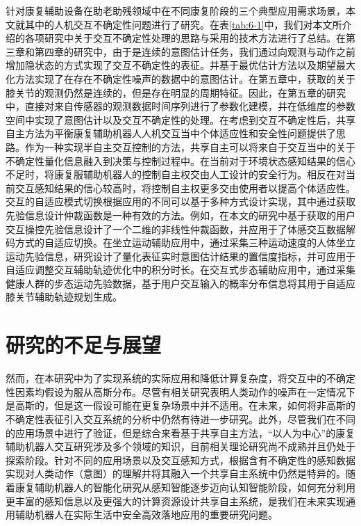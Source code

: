 针对康复辅助设备在助老助残领域中在不同康复阶段的三个典型应用需求场景，本文就其中的人机交互不确定性问题进行了研究。在表\ref{tab:6-1}中，我们对本文所介绍的各项研究中关于交互不确定性处理的思路与采用的技术方法进行了总结。在第三章和第四章的研究中，由于是连续的意图估计任务，我们通过向观测与动作之前增加隐状态的方式实现了交互不确定性的表征。并基于最优估计方法以及期望最大化方法实现了在存在不确定性噪声的数据中的意图估计。在第五章中，获取的关于膝关节的观测仍然是连续的，但是存在明显的周期特征。因此，在第五章的研究中，直接对来自传感器的观测数据时间序列进行了参数化建模，并在低维度的参数空间中实现了意图估计以及交互不确定性的处理。在考虑到交互不确定性后，共享自主方法为平衡康复辅助机器人人机交互当中个体适应性和安全性问题提供了思路。作为一种实现半自主交互控制的方法，共享自主可以将来自于交互当中的关于不确定性量化信息融入到决策与控制过程中。在当前对于环境状态感知结果的信心不足时，将康复服辅助机器人的控制自主权交由人工设计的安全行为。相反在对当前交互感知结果的信心较高时，将控制自主权更多交由使用者以提高个体适应性。交互的自适应模式切换根据应用的不同可以基于多种方式设计实现，其中通过获取先验信息设计仲裁函数是一种有效的方法。例如，在本文的研究中基于获取的用户交互操控先验信息设计了一个二维的非线性仲裁函数，并应用于了体感交互数据解码方式的自适应切换。在坐立运动辅助应用中，通过采集三种运动速度的人体坐立运动先验信息，研究设计了量化表征实时意图估计结果的置信度指标，并可应用于自适应调整交互辅助轨迹优化中的积分时长。在交互式步态辅助应用中，通过采集健康人群的步态运动先验数据，基于用户交互输入的概率分布信息将其用于自适应膝关节辅助轨迹规划生成。

\section{研究的不足与展望}
然而，在本研究中为了实现系统的实际应用和降低计算复杂度，将交互中的不确定性因素均假设为服从高斯分布。尽管有相关研究表明人类动作的噪声在一定情况下是高斯的，但是这一假设可能在更复杂场景中并不适用。在未来，如何将非高斯的不确定性表征引入交互系统的分析中仍然有待进一步研究。此外，尽管我们在不同的应用场景中进行了验证，但是综合来看基于共享自主方法，``以人为中心''的康复辅助机器人交互研究涉及多个领域的知识，目前相关理论研究尚不成熟并且仍处于探索阶段。针对不同的应用场景以及交互感知方式，根据含有不确定性的感知数据实现对人类动作（意图）的理解并将其融入一个共享自主系统中仍然是特异的。随着康复辅助机器人的智能化研究从感知智能逐步迈向认知智能阶段，如何充分利用更丰富的感知信息以及更强大的计算资源设计共享自主系统，是我们在未来实现通用辅助机器人在实际生活中安全高效落地应用的重要研究问题。